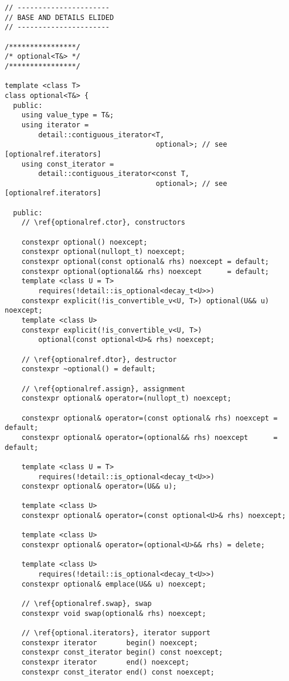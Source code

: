 \documentclass[a4paper,10pt,oneside,openany,final,article]{memoir}
\begin{document}
\begin{verbatim}
// ----------------------
// BASE AND DETAILS ELIDED
// ----------------------

/****************/
/* optional<T&> */
/****************/

template <class T>
class optional<T&> {
  public:
    using value_type = T&;
    using iterator =
        detail::contiguous_iterator<T,
                                    optional>; // see [optionalref.iterators]
    using const_iterator =
        detail::contiguous_iterator<const T,
                                    optional>; // see [optionalref.iterators]

  public:
    // \ref{optionalref.ctor}, constructors

    constexpr optional() noexcept;
    constexpr optional(nullopt_t) noexcept;
    constexpr optional(const optional& rhs) noexcept = default;
    constexpr optional(optional&& rhs) noexcept      = default;
    template <class U = T>
        requires(!detail::is_optional<decay_t<U>>)
    constexpr explicit(!is_convertible_v<U, T>) optional(U&& u) noexcept;
    template <class U>
    constexpr explicit(!is_convertible_v<U, T>)
        optional(const optional<U>& rhs) noexcept;

    // \ref{optionalref.dtor}, destructor
    constexpr ~optional() = default;

    // \ref{optionalref.assign}, assignment
    constexpr optional& operator=(nullopt_t) noexcept;

    constexpr optional& operator=(const optional& rhs) noexcept = default;
    constexpr optional& operator=(optional&& rhs) noexcept      = default;

    template <class U = T>
        requires(!detail::is_optional<decay_t<U>>)
    constexpr optional& operator=(U&& u);

    template <class U>
    constexpr optional& operator=(const optional<U>& rhs) noexcept;

    template <class U>
    constexpr optional& operator=(optional<U>&& rhs) = delete;

    template <class U>
        requires(!detail::is_optional<decay_t<U>>)
    constexpr optional& emplace(U&& u) noexcept;

    // \ref{optionalref.swap}, swap
    constexpr void swap(optional& rhs) noexcept;

    // \ref{optional.iterators}, iterator support
    constexpr iterator       begin() noexcept;
    constexpr const_iterator begin() const noexcept;
    constexpr iterator       end() noexcept;
    constexpr const_iterator end() const noexcept;


\end{verbatim}
\end{document}
